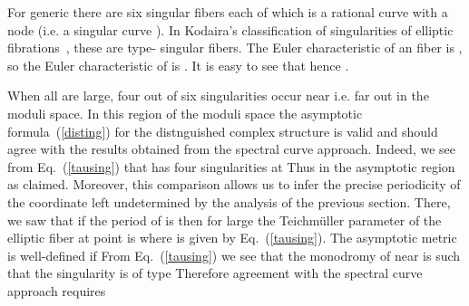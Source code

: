 \documentclass[a4paper,12pt, amsfonts, amssymb]{article}
\providecommand{\NN}{{\mathbb N}}
\begin{document}
For generic \coordHE{} there are six singular fibers each of which is a rational curve with a node (i.e. a singular curve \coordHE{}). In Kodaira's classification of singularities of elliptic fibrations~\cite{Ko},
these are type-\coordHE{} singular fibers. The Euler characteristic of an
\coordHE{} fiber is \coordHE{}, so the Euler characteristic of \coordHE{} is \coordHE{}. It is easy to see that \coordHE{} hence \coordHE{}.

When all \coordHE{} are large, four out of six singularities occur
near \coordHE{} i.e. far out in the moduli space. In this region of
the moduli space the asymptotic formula~(\ref{disting}) for the distnguished
complex structure is valid and should agree with the results obtained
from the spectral curve approach. Indeed, we see from Eq.~(\ref{tausing})
that \coordHE{} has four singularities at \coordHE{} Thus in the
asymptotic region \coordHE{} as claimed. Moreover, this comparison
allows us to infer the precise
periodicity of the coordinate \coordHE{} left undetermined by the analysis of the
previous section. There, we saw that if the period of \coordHE{} is \coordHE{}
then for large \coordHE{} the Teichm\"uller parameter of the elliptic fiber at point \coordHE{} is \coordHE{} where \coordHE{} is given by
Eq.~(\ref{tausing}). The asymptotic metric is well-defined if
\myHighlight{$p/4\in\NN.$}\coordHE{} From Eq.~(\ref{tausing}) we see that the monodromy of
\coordHE{} near \coordHE{} is such that the singularity is
of type \coordHE{}
Therefore agreement with the spectral curve approach requires \coordHE{}
\end{document}
